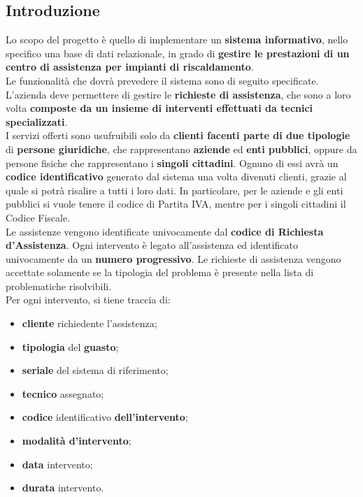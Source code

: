 \documentclass[legalpaper]{article}
\begin{document}
\subsection{Introduzione}
Lo scopo del progetto è quello di implementare un \textbf{sistema informativo}, nello specifico una base di dati relazionale, in grado di \textbf{gestire le prestazioni di un centro di assistenza per impianti di riscaldamento}.\\ \newline
Le funzionalità che dovrà prevedere il sistema sono di seguito specificate.\\
L'azienda deve permettere di gestire le \textbf{richieste di assistenza}, che sono a loro volta \textbf{composte da un insieme di interventi effettuati da tecnici specializzati}.\\
I servizi offerti sono usufruibili solo da \textbf{clienti facenti parte di due tipologie} di \textbf{persone giuridiche}, che rappresentano \textbf{aziende} ed \textbf{enti pubblici}, oppure da persone fisiche che rappresentano i \textbf{singoli cittadini}.
Ognuno di essi avrà un \textbf{codice identificativo} generato dal sistema una volta divenuti clienti, grazie al quale si potrà risalire a tutti i loro dati.
In particolare, per le aziende e gli enti pubblici si vuole tenere il codice di Partita IVA, mentre per i singoli cittadini il Codice Fiscale.\\
Le assistenze vengono identificate univocamente dal \textbf{codice di Richiesta d'Assistenza}. Ogni intervento è legato all'assistenza ed identificato univocamente da un \textbf{numero progressivo}. 
Le richieste di assistenza vengono accettate solamente se la tipologia del problema è presente nella lista di problematiche risolvibili. \\ \newline
Per ogni intervento, si tiene traccia di:
\medskip
\begin{itemize}
    \item \textbf{cliente} richiedente l'assistenza;
    \item \textbf{tipologia} del \textbf{guasto};
    \item \textbf{seriale} del sistema di riferimento;
    \item \textbf{tecnico} assegnato;
    \item \textbf{codice} identificativo \textbf{dell'intervento};
    \item \textbf{modalità d'intervento};
    \item \textbf{data} intervento;
    \item \textbf{durata} intervento.
\end{itemize}
\end{document}

